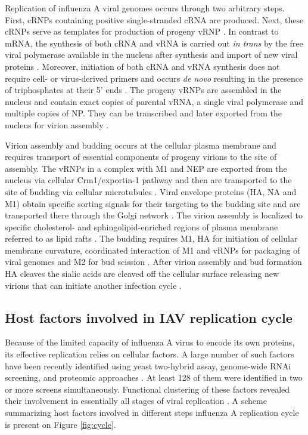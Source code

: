 	Replication of influenza A viral genomes occurs through two arbitrary steps. First, \gls{cRNP}s containing positive single-stranded cRNA are produced. Next, these \gls{cRNP}s serve as templates for production of progeny \gls{vRNP} \parencite{Elton2005}. In contrast to mRNA, the synthesis of both cRNA and vRNA is carried out \textit{in trans} by the free viral polymerase available in the nucleus after synthesis and import of new viral proteins \parencite{Jorba2009, Moeller2012}. Moreover, initiation of both cRNA and vRNA synthesis does not require cell- or virus-derived primers and occurs \textit{de novo} resulting in the presence of triphosphates at their 5' ends \parencite{Hay1982, Zhang2010}. The progeny \gls{vRNP}s are assembled in the nucleus and contain exact copies of parental vRNA, a single viral polymerase and multiple copies of \gls{NP}. They can be transcribed and later exported from the nucleus for virion assembly \parencite{Resa-Infante2011}. 
	
	Virion assembly and budding occurs at the cellular plasma membrane and requires transport of essential components of progeny virions to the site of assembly. The \gls{vRNP}s in a complex with \gls{M1} and \gls{NEP} are exported from the nucleus via cellular Crm1/exportin-1 pathway and then are transported to the site of budding via cellular microtubules \parencite{Akarsu2003, Momose2007, Kawaguchi2012}. Viral envelope proteins (\gls{HA}, \gls{NA} and \gls{M1}) obtain specific sorting signals for their targeting to the budding site \parencite{Hughey1992, Kundu1996, Tall2003} and are transported there through the Golgi network \parencite{Daniels-Holgate1989}. The virion assembly is localized to specific  cholesterol- and sphingolipid-enriched regions of plasma membrane referred to as lipid rafts \parencite{Scheiffele1999}. The budding requires \gls{M1}, \gls{HA} for initiation of cellular membrane curvature, coordinated interaction of \gls{M1} and \gls{vRNP}s for packaging of viral genomes and \gls{M2} for bud scission \parencite{Nayak2009a, Rossman2011}. After virion assembly and bud formation \gls{HA} cleaves the sialic acids are cleaved off the cellular surface releasing new virions that can initiate another infection cycle \parencite{Barman2004}.

	
	\subsection{Host factors involved in IAV replication cycle}
	
	Because of the limited capacity of influenza A virus to encode its own proteins, its effective replication relies on cellular factors. A large number of such factors have been recently identified using yeast two-hybrid assay, genome-wide RNAi screening, and proteomic approaches \parencite{Mayer2007, Brass2009, Shapira2009, Hao2008, Karlas2010, Konig2010, Shaw2011, Song2011}. At least 128 of them were identified in two or more screens simultaneously. Functional clustering of these factors revealed their involvement in essentially all stages of viral replication \parencite{Watanabe2010}. A scheme summarizing host factors involved in different steps influenza A replication cycle is present on Figure \ref{fig:cycle}.
	
